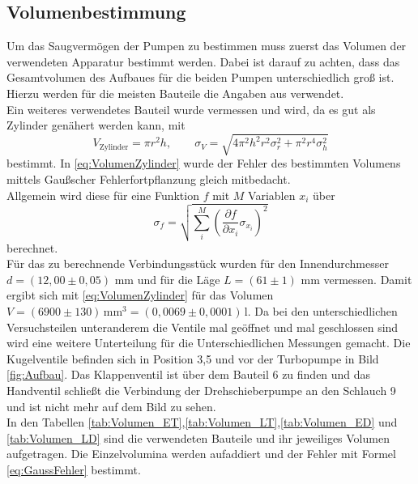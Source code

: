 \subsection{Volumenbestimmung}
Um das Saugvermögen der Pumpen zu bestimmen muss zuerst das Volumen der verwendeten Apparatur bestimmt werden. Dabei ist
darauf zu achten, dass das Gesamtvolumen des Aufbaues für die beiden Pumpen unterschiedlich groß ist.\\
Hierzu werden für die meisten Bauteile die Angaben aus \cite{Anleitung} verwendet.\\
Ein weiteres verwendetes Bauteil wurde vermessen und wird, da es gut als Zylinder genähert werden kann, mit
\begin{equation}
  V_{\text{Zylinder}}=\pi r^2 h, \qquad \sigma_{V}=\sqrt{4 \pi^{2} h^{2} r^{2} \sigma_{r}^{2}  + \pi^{2} r^{4} \sigma_{h}^{2} }
\label{eq:VolumenZylinder}
\end{equation}
bestimmt. In \ref{eq:VolumenZylinder} wurde der Fehler des bestimmten Volumens mittels Gaußscher Fehlerfortpflanzung gleich mitbedacht.\\
Allgemein wird diese für eine Funktion $f$ mit $M$ Variablen $x_i$ über
\begin{equation}
  \label{eq:GaussFehler}
  \sigma_f= \sqrt{ \sum_i^M \left(\frac{\partial f}{\partial x_i} \sigma_{x_i}\right)^2}
\end{equation}
berechnet.\\
Für das zu berechnende Verbindungsstück wurden für den Innendurchmesser $d=(12,00 \pm 0,05)$ mm und für die Läge $L=(61\pm 1)$ mm vermessen.
Damit ergibt sich mit \ref{eq:VolumenZylinder} für das Volumen $V=(6900 \pm 130)\,\text{mm}^3 = (0,0069 \pm 0,0001)$\,l.
Da bei den unterschiedlichen Versuchsteilen unteranderem die Ventile mal geöffnet und mal geschlossen sind wird eine weitere Unterteilung
für die Unterschiedlichen Messungen gemacht. Die Kugelventile befinden sich in Position 3,5 und vor der Turbopumpe in Bild \ref{fig:Aufbau}.
Das Klappenventil ist über dem Bauteil 6 zu finden und das Handventil schließt die Verbindung der Drehschieberpumpe an den Schlauch 9 und ist nicht mehr
auf dem Bild zu sehen.\\
In den Tabellen \ref{tab:Volumen_ET},\ref{tab:Volumen_LT},\ref{tab:Volumen_ED} und \ref{tab:Volumen_LD} sind die verwendeten Bauteile
 und ihr jeweiliges Volumen aufgetragen.
Die Einzelvolumina werden aufaddiert und der Fehler mit Formel \ref{eq:GaussFehler} bestimmt.

